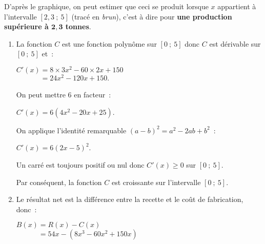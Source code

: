 \begin{corrige}
\begin{enumerate}
          D'après le graphique, on peut estimer que ceci se produit lorsque $x$ appartient à l'intervalle $[2,3~;~5]$ (tracé en \textit{brun}), c'est à dire pour \textbf{une production supérieure à $\bm{2,3}$ tonnes}.
          \par
     \end{enumerate}
     \par
     \par
     \begin{enumerate}
          \item La fonction $C$ est une fonction polynôme sur $[0~;~5]$ donc $C$ est dérivable sur $[0~;~5]$ et~:
          \par
          $C'(x)= 8 \times 3x^2 - 60 \times 2x + 150$\\
          $\phantom{C'(x)}= 24x^2 - 120x + 150.$
          \par
          On peut mettre $6$ en facteur~:
          \par
          $C'(x)= 6(4x^2-20x+25)$.
          \par
          On applique l'identité remarquable $(a-b)^2=a^2-2ab+b^2$~:
          \par
          $C'(x)= 6(2x-5)^2$.
          \par
          Un carré est toujours positif ou nul donc $C'(x) \geqslant 0$ sur $[0~;~5]$.
          \par
          Par conséquent, la fonction $C$ est croissante sur l'intervalle $[0~;~5]$.
          \par
          \par
          \item
          Le résultat net est la différence entre la recette et le coût de fabrication, donc~:
          \par
          $B(x)=R(x)-C(x)$\\
          $\phantom{B(x)}=54x-(8x^3-60x^2+150x)$\\

\end{enumerate}
\end{corrige}
